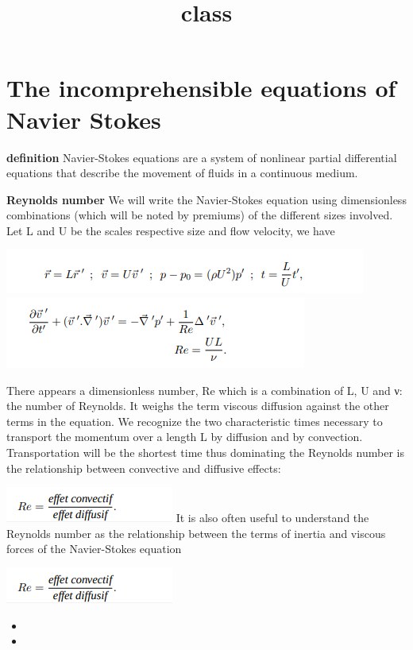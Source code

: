 \documentclass[10pt]{beamer}
\title{class}
\begin{document}
\section{The incomprehensible equations of Navier Stokes}
\begin{frame}
\textbf{definition}
Navier-Stokes equations are a system of nonlinear partial differential equations that describe the movement of fluids in a continuous medium.

\textbf{Reynolds number}
We will write the Navier-Stokes equation using dimensionless combinations (which
will be noted by premiums) of the different sizes involved. Let L and U be the scales
respective size and flow velocity, we have

\includegraphics[scale=0.5]{images/eq1.png}
\includegraphics[scale=0.5]{images/eq2.png}

There appears a dimensionless number, Re which is a combination of L, U and ν: the number of
Reynolds. It weighs the term viscous diffusion against the other terms in the equation.
We recognize the two characteristic times necessary to transport the momentum
over a length L by diffusion and by convection. Transportation will be the shortest time
thus dominating the Reynolds number is the relationship between convective and diffusive effects:

\includegraphics[scale=0.5]{images/eq3.png}
It is also often useful to understand the Reynolds number as the relationship between the terms
of inertia and viscous forces of the Navier-Stokes equation

\includegraphics[scale=0.5]{images/eq3.png}

\begin{itemize}
\item 
\item 
\end{itemize}

\end{frame}
\end{document}
